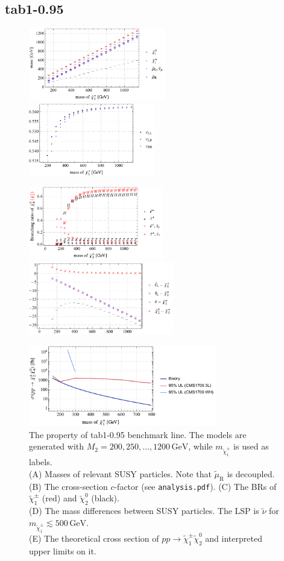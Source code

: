 \documentclass[a4paper,10pt,captions=tableheading,DIV=14]{scrartcl}
\numberwithin{equation}{section}
\newcommand\w[1]{_{\mathrm{#1}}}
\newcommand\unit[1]{\,\mathrm{#1}\xspace}
\newcommand\GeV{\unit{GeV}}
\newcommand\neut  [1][\relax]{{\tilde\chi^0_{#1}}}
\newcommand\charPM[1][\relax]{{\tilde\chi^\pm_{#1}}}
\begin{document}
\subsection{tab1-0.95}
\begin{figure}[h]
  \centering
  \includegraphics[height=90pt]{../plots/plot_tab1x095_mass.pdf}
  \includegraphics[height=90pt]{../plots/plot_tab1x095_cfactors.pdf}
\par
  \includegraphics[height=90pt]{../plots/plot_tab1x095_br21.pdf}
  \includegraphics[height=90pt]{../plots/plot_tab1x095_massdiff.pdf}
\par
  \includegraphics[height=100pt]{../plots/plot_tab1x095_limit21.pdf}
  \caption{\label{fig:tab1x095}The property of tab1-0.95 benchmark line. The models are generated with $M_2=200,250,\dots,1200\GeV$, while $m_{\charPM[1]}$ is used as labels.\\
 (A) Masses of relevant SUSY particles. Note that $\tilde\mu\w R$ is decoupled.
 (B) The cross-section $c$-factor (see \texttt{analysis.pdf}).
 (C) The BRs of $\charPM[1]$ (red) and $\neut[2]$ (black).\\
 (D) The mass differences between SUSY particles. The LSP is  $\tilde\nu$ for $m_{\charPM[1]}\lesssim 500\GeV$.\\
 (E) The theoretical cross section of $pp\to\charPM[1]\neut[2]$ and interpreted upper limits on it.
}
\end{figure}
\end{document}
